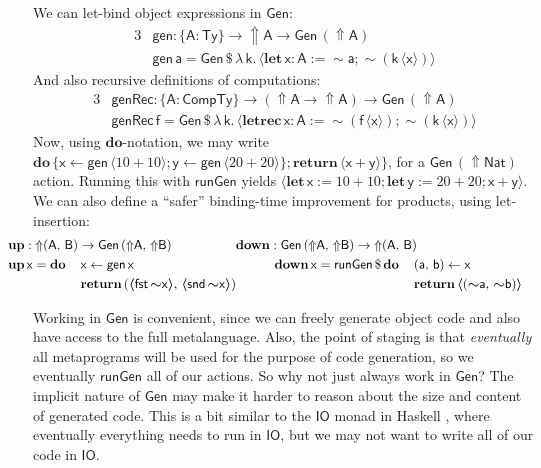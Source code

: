 \documentclass[acmsmall]{acmart}
\newcommand{\mit}[1]{{\mathsf{#1}}}
\newcommand{\msf}[1]{{\mathsf{#1}}}
\newcommand{\mbf}[1]{{\mathbf{#1}}}
\newcommand{\bs}[1]{\boldsymbol{#1}}
\newcommand{\mdo}{\mbf{do}\,}
\newcommand{\ind}{\hspace{1em}}
\newcommand{\return}{\mbf{return}\,}
\newcommand{\lam}{\lambda\,}
\newcommand{\letrec}{\mbf{letrec}\,}
\newcommand{\letdef}{\mbf{let\,}}
\newcommand{\vk}{\mathsf{k}}
\newcommand{\vA}{\mathsf{A}}
\newcommand{\vB}{\mathsf{B}}
\newcommand{\va}{\mathsf{a}}
\newcommand{\vb}{\mathsf{b}}
\newcommand{\vx}{\mathsf{x}}
\newcommand{\vy}{\mathsf{y}}
\newcommand{\vf}{\mathsf{f}}
\newcommand{\fro}{\leftarrow}
\newcommand{\Up}{{\Uparrow}}
\newcommand{\spl}{{\bs{\sim}}}
\newcommand{\ql}{{\bs{\langle}}}
\newcommand{\qr}{{\bs{\rangle}}}
\newcommand{\Ty}{\msf{Ty}}
\newcommand{\CTy}{\msf{CompTy}}
\newcommand{\fst}{\msf{fst}}
\newcommand{\snd}{\msf{snd}}
\newcommand{\Nat}{\msf{Nat}}
\theoremstyle{remark}
\newcommand{\mup}{\mbf{up}}
\newcommand{\mdown}{\mbf{down}}
\newcommand{\Gen}{\msf{Gen}}
\newcommand{\gen}{\mit{gen}}
\newcommand{\genRec}{\mit{genRec}}
\newcommand{\runGen}{\mit{runGen}}
\newcommand{\qt}[1]{\ql#1\qr}
\newcommand{\dlr}{\,\$\,}
\begin{document}
We can let-bind object expressions in $\Gen$:
\begin{alignat*}{3}
  & \gen : \{\vA : \Ty\} \to \Up \vA \to \Gen\,(\Up \vA) \\
  & \gen\,\va = \Gen \dlr \lam \vk.\,\ql \letdef \vx : \vA := \spl \va; \spl(\vk\,\ql \vx \qr) \qr
\end{alignat*}
And also recursive definitions of computations:
\begin{alignat*}{3}
  & \genRec : \{\vA : \CTy\} \to (\Up \vA \to \Up \vA) \to \Gen\,(\Up \vA) \\
  & \genRec\,\vf = \Gen \dlr \lam \vk.\,\qt{\letrec \vx : \vA := \spl(\vf\,\qt{\vx}); \spl(\vk\,\qt{\vx})}
\end{alignat*}
Now, using $\mbf{do}$-notation, we may write $\mdo \{\vx \fro \gen\,\qt{10 + 10}; \vy \fro
\gen\,\qt{20 + 20}\};\return \qt{\vx + \vy}\}$, for a $\Gen\,(\Up \Nat)$
action. Running this with $\runGen$ yields $\qt{\letdef \vx := 10 + 10; \letdef \vy
  := 20 + 20; \vx + \vy}$. We can also define a ``safer'' binding-time improvement for
products, using let-insertion:
\begin{alignat*}{6}
  &\hspace{-2em}\mathrlap{\mup : \Up (\vA,\,\vB) \to \Gen\,(\Up \vA,\,\Up \vB)             \hspace{5em} \mdown : \Gen\,(\Up \vA,\, \Up \vB) \to \Up(\vA,\,\vB)} \\
  &\hspace{-2em}\mup\,\vx = \mdo &&\vx \fro \gen\,\vx                                    && \ind\ind \mdown\,\vx = \runGen \dlr \mdo &&(\va,\,\vb) \fro \vx\\
  &\hspace{-2em}               &&\return (\qt{\fst\,\spl \vx},\,\qt{\snd\,\spl \vx})     &&                           &&\return \qt{(\spl \va,\, \spl \vb)}
\end{alignat*}

Working in $\Gen$ is convenient, since we can freely generate object code and
also have access to the full metalanguage. Also, the point of staging is that
\emph{eventually} all metaprograms will be used for the purpose of code
generation, so we eventually $\runGen$ all of our actions. So why not just
always work in $\Gen$? The implicit nature of $\Gen$ may make it harder to
reason about the size and content of generated code. This is a bit similar to
the $\msf{IO}$ monad in Haskell \cite{jones2001tackling}, where eventually
everything needs to run in $\msf{IO}$, but we may not want to write all of our
code in $\msf{IO}$.
\end{document}
